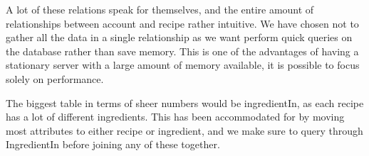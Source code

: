A lot of these relations speak for themselves, and the entire amount of relationships between account and recipe rather intuitive. We have chosen not to gather all the data in a single relationship as we want perform quick queries on the database rather than save memory. This is one of the advantages of having a stationary server with a large amount of memory available, it is possible to focus solely on performance. 

The biggest table in terms of sheer numbers would be ingredientIn, as each recipe has a lot of different ingredients. This has been accommodated for by moving most attributes to either recipe or ingredient, and we make sure to query through IngredientIn before joining any of these together.

